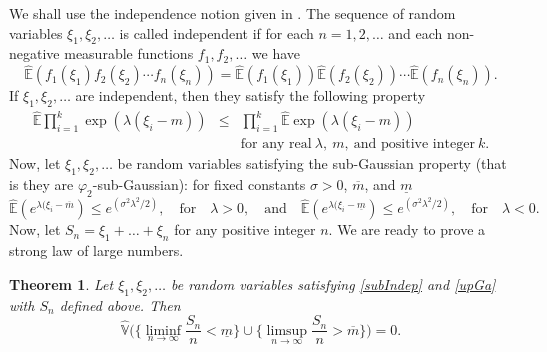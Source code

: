 \documentclass[12pt]{article}
\newtheorem{theorem}{Theorem}[section]
\theoremstyle{definition}
\theoremstyle{remark}
\numberwithin{equation}{section}
\def\Eh{{\hat{\mathbb{E}}}}
\def\Vh{{\hat{\mathbb{V}}}}
\begin{document}
We shall use the independence notion given in \cite{ChenZ2013}.
The sequence of random variables $\xi_1, \xi_2, \dots$
is called independent if for each $n=1,2,\dots$ and each non-negative measurable functions $f_1, f_2, \dots$
we have 
$$
\Eh(f_1(\xi_1) f_2(\xi_2) \cdots f_n(\xi_n))  = \Eh(f_1(\xi_1)) \Eh(f_2(\xi_2)) \cdots \Eh(f_n(\xi_n)) .
$$
If $\xi_1, \xi_2, \dots$ are independent, then they satisfy the following property
\begin{eqnarray} \label{subIndep}
\Eh \prod_{i=1}^k \exp\left( {\lambda}  (\xi_i- m) \right) 
&\le&
\prod_{i=1}^k \Eh \exp\left( {\lambda}  (\xi_i- m) \right)  \nonumber \\ 
& &\text{for any real} \ \lambda, \ m , \ \text{and positive integer} \ k .
\end{eqnarray}
Now, let $\xi_1, \xi_2, \dots $ be random variables satisfying the sub-Gaussian property
(that is they are $\varphi_2$-sub-Gaussian):
for fixed constants
$\sigma > 0$, $\overline{m}$, and $\underline{m}$
\begin{equation}   \label{upGa}
\Eh (e^{\lambda(\xi_i - \overline{m}})  \le e^{(\sigma^2\lambda^2/2)}, \quad {\text {for}} \quad \lambda>0, \quad \text{and} \quad\Eh (e^{\lambda(\xi_i - \underline{m}}) \le e^{(\sigma^2\lambda^2/2)}, \quad {\text {for}} \quad \lambda<0.
\end{equation}
Now, let $S_n = \xi_1 + \dots + \xi_n$ for any positive integer $n$.
We are ready to prove a strong law of large numbers. 
\begin{theorem}  \label{iidSLLN}
Let $\xi_1, \xi_2, \dots $ be random variables satisfying \eqref{subIndep} and \eqref{upGa} 
with $S_n$ defined above. Then
\begin{equation}
\label{eq:SLLN-capacity}
\Vh\Big(
\Big\{\liminf_{n\to\infty}\frac{S_n}{n}< \underline{m}\Big\}
\cup
\Big\{\limsup_{n\to\infty}\frac{S_n}{n}> \overline{m}\Big\}
\Big)=0.
\end{equation}
\end{theorem}
\end{document}
